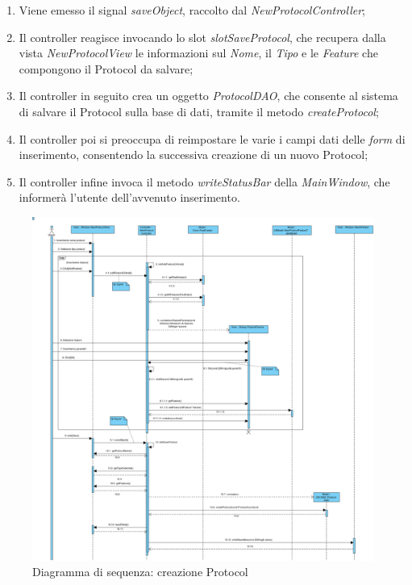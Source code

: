 \begin{enumerate}
	\item Viene emesso il signal\g{} \textit{saveObject}, raccolto dal \textit{NewProtocolController};
	\item Il controller reagisce invocando lo slot\g{} \textit{slotSaveProtocol}, che recupera dalla vista \textit{NewProtocolView} le informazioni sul \textit{Nome}, il \textit{Tipo} e le \textit{Feature} che compongono il Protocol\g{} da salvare;
	\item Il controller in seguito crea un oggetto \textit{ProtocolDAO}, che consente al sistema di salvare il Protocol\g{} sulla base di dati, tramite il metodo \textit{createProtocol};
	\item Il controller poi si preoccupa di reimpostare le varie i campi dati delle \textit{form} di inserimento, consentendo la successiva creazione di un nuovo Protocol\g{};
	\item Il controller infine invoca il metodo \textit{writeStatusBar} della \textit{MainWindow}, che informerà l'utente dell'avvenuto inserimento.
\end{enumerate}

\pagebreak
\begin{figure}[!h]
\centering
			\includegraphics[width=1.12\linewidth]{./Content/Immagini/Creazione_protocol.png}
			\caption{Diagramma di sequenza: creazione Protocol}
			\label{creazione_protocol_img}
\end{figure}
\pagebreak

